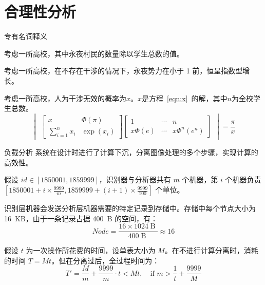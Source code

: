 \section{合理性分析}
    \begin{frame}{专有名词释义}
        \begin{definition}[永夜势力]
            考虑一所高校，其中永夜村民的数量除以学生总数的值。
        \end{definition}
        \begin{theorem}[永夜定理]
            考虑一所高校，在不存在干涉的情况下，永夜势力在小于 1 前，恒呈指数型增长。
        \end{theorem}
        \begin{theorem}[永夜方程]
            考虑一所高校，人为干涉无效的概率为$x$。$x$是方程~\ref{eqn:x}~的解，其中$n$为全校学生总数。
        \begin{equation}\label{eqn:x}
            \begin{vmatrix}
            \begin{bmatrix}
                    x & \Phi(\pi) \\
                    \sum_{i = 1}^n x_i & \exp(x_i)
            \end{bmatrix}
            \begin{bmatrix}
                    1 & \cdots & n \\
                    x\Phi(e) & \cdots & x\Phi^n(e^n)
            \end{bmatrix}
            \end{vmatrix} = \dfrac{\pi}{x}
        \end{equation}
        \end{theorem}
    \end{frame}

    \begin{frame}{负载分析}
        系统在设计时进行了计算下沉，分离图像处理的多个步骤，实现计算的高效性。

        假设 $id \in [1850001, 1859999]$，识别器与分析器共有 $m$ 个机器，第 $i$ 个机器负责 $\left[1850001 + i \times \frac{9999}{m}, 1859999 + (i + 1) \times \frac{9999}{100}\right]$ 个单位。

        识别层机器会发送分析层机器需要的特定记录到存储中。存储中每个节点大小为 16~KB，由于一条记录占据 400~B 的空间，有：
        \begin{equation}
            Node = \dfrac{16 \times 1024\operatorname{B}}{400 \operatorname{B}} \approx 16
        \end{equation}

        假设 $t$ 为一次操作所花费的时间，设单表大小为 $M$。在不进行计算分离时，消耗的时间 $T = Mt$。但在分离过后，全过程时间为：
        \begin{equation}
            T' = \dfrac{M}{m} + \dfrac{9999}{m} \cdot t < Mt, \quad \text{if } m > \dfrac{1}{t} + \dfrac{9999}{M}
        \end{equation}
    \end{frame}


